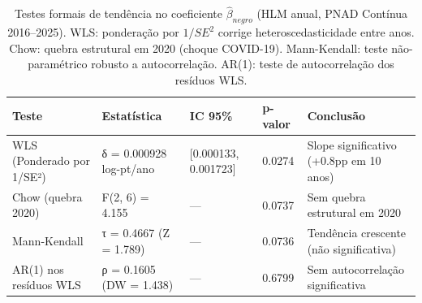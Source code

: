 \begin{table}
\caption{Testes formais de tendência no coeficiente $\hat{\beta}_{negro}$ (HLM anual, PNAD Contínua 2016--2025). WLS: ponderação por $1/SE^2$ corrige heteroscedasticidade entre anos. Chow: quebra estrutural em 2020 (choque COVID-19). Mann-Kendall: teste não-paramétrico robusto a autocorrelação. AR(1): teste de autocorrelação dos resíduos WLS.}
\label{tab:tendencia_temporal}
\begin{tabular}{lllll}
\toprule
Teste & Estatística & IC 95\% & p-valor & Conclusão \\
\midrule
WLS (Ponderado por 1/SE²) & δ = 0.000928 log-pt/ano & [0.000133, 0.001723] & 0.0274 & Slope significativo (+0.8pp em 10 anos) \\
Chow (quebra 2020) & F(2, 6) = 4.155 & — & 0.0737 & Sem quebra estrutural em 2020 \\
Mann-Kendall & τ = 0.4667  (Z = 1.789) & — & 0.0736 & Tendência crescente (não significativa) \\
AR(1) nos resíduos WLS & ρ = 0.1605  (DW = 1.438) & — & 0.6799 & Sem autocorrelação significativa \\
\bottomrule
\end{tabular}
\end{table}
